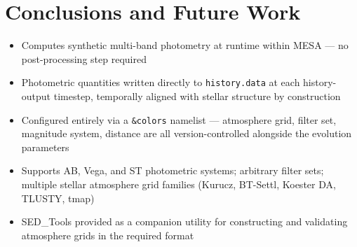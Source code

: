 \documentclass[linenumbers,apj,twocolumn, floatfix]{aastex701}
\begin{document}
\section{Conclusions and Future Work}
\label{sec:conclusions}
 
 
 
\begin{itemize}
    \item Computes synthetic multi-band photometry at runtime within MESA — no post-processing step required
    \item Photometric quantities written directly to \texttt{history.data} at each history-output timestep, temporally aligned with stellar structure by construction
    \item Configured entirely via a \texttt{\&colors} namelist — atmosphere grid, filter set, magnitude system, distance are all version-controlled alongside the evolution parameters
    \item Supports AB, Vega, and ST photometric systems; arbitrary filter sets; multiple stellar atmosphere grid families (Kurucz, BT-Settl, Koester DA, TLUSTY, tmap)
    \item SED\_Tools provided as a companion utility for constructing and validating atmosphere grids in the required format
\end{itemize}
 
\end{document}
